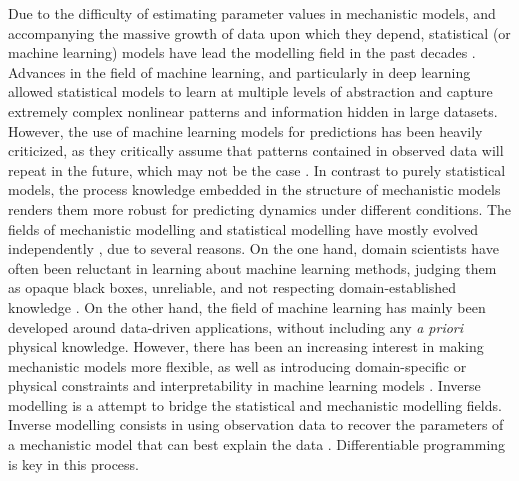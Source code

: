 Due to the difficulty of estimating parameter values in mechanistic models, and accompanying the massive growth of data upon which they depend, statistical (or machine learning) models have lead the modelling field in the past decades \cite{Cox:2017hv}. Advances in the field of machine learning, and particularly in deep learning \cite{LeCun2015} allowed statistical models to learn at multiple levels of abstraction and capture extremely complex nonlinear patterns and information hidden in large datasets. 
However, the use of machine learning models for predictions has been heavily criticized, as they critically assume that patterns contained in observed data will repeat in the future, which may not be the case \cite{dormann2007,Barnosky2012}. 
In contrast to purely statistical models, the process knowledge embedded in the structure of mechanistic models renders them more robust for predicting dynamics under different conditions.
The fields of mechanistic modelling and statistical modelling have mostly evolved independently \cite{zdeborova_understanding_2020}, due to several reasons. 
On the one hand, domain scientists have often been reluctant in learning about machine learning methods, judging them as opaque black boxes, unreliable, and not respecting domain-established knowledge \cite{Coveney:2016eb}. 
On the other hand, the field of machine learning has mainly been developed around data-driven applications, without including any \textit{a priori} physical knowledge. 
However, there has been an increasing interest in making mechanistic models more flexible, as well as introducing domain-specific or physical constraints and interpretability in machine learning models \cite{Molnar.2020sisk,Rudin.2022,Schneider2017,rasp2018,Yazdani2020,Abarbanel2018,Carrassi2018,Bocquet2019,Gabor2015,Gharamti2017,Curtsdotter2019,Rosenbaum2019,Toms2020,Brajard2021}.
Inverse modelling is a attempt to bridge the statistical and mechanistic modelling fields. Inverse modelling consists in using observation data to recover the parameters of a mechanistic model that can best explain the data  \cite{Wigner.1960, Rude:2018jv}. Differentiable programming is key in this process.



